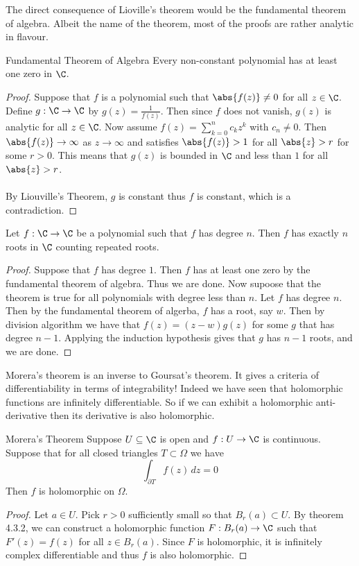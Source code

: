 \documentclass[a4paper]{article}
\begin{document}
The direct consequence of Lioville's theorem would be the fundamental theorem of algebra. Albeit the name of the theorem, most of the proofs are rather analytic in flavour. 

\begin{thm}{Fundamental Theorem of Algebra}{} Every non-constant polynomial has at least one zero in $\C$. \tcbline
\begin{proof}
Suppose that $f$ is a polynomial such that $\abs{f(z)}\neq 0$ for all $z\in\C$. Define $g:\C\to\C$ by $g(z)=\frac{1}{f(z)}$. Then since $f$ does not vanish, $g(z)$ is analytic for all $z\in\C$. Now assume $f(z)=\sum_{k=0}^nc_kz^k$ with $c_n\neq 0$. Then $\abs{f(z)}\to\infty$ as $z\to\infty$ and satisfies $\abs{f(z)}>1$ for all $\abs{z}>r$ for some $r>0$. This means that $g(z)$ is bounded in $\C$ and less than $1$ for all $\abs{z}>r$. \\~\\
By Liouville's Theorem, $g$ is constant thus $f$ is constant, which is a contradiction. 
\end{proof}
\end{thm}

\begin{prp}{}{} Let $f:\C\to\C$ be a polynomial such that $f$ has degree $n$. Then $f$ has exactly $n$ roots in $\C$ counting repeated roots. \tcbline
\begin{proof}
Suppose that $f$ has degree $1$. Then $f$ has at least one zero by the fundamental theorem of algebra. Thus we are done. Now supoose that the theorem is true for all polynomials with degree less than $n$. Let $f$ has degree $n$. Then by the fundamental theorem of algerba, $f$ has a root, say $w$. Then by division algorithm we have that $f(z)=(z-w)g(z)$ for some $g$ that has degree $n-1$. Applying the induction hypothesis gives that $g$ has $n-1$ roots, and we are done. 
\end{proof}
\end{prp}

Morera's theorem is an inverse to Goursat's theorem. It gives a criteria of differentiability in terms of integrability! Indeed we have seen that holomorphic functions are infinitely differentiable. So if we can exhibit a holomorphic anti-derivative then its derivative is also holomorphic. 

\begin{thm}{Morera's Theorem}{} Suppose $U\subseteq\C$ is open and $f:U\to\C$ is continuous. Suppose that for all closed triangles $T\subset\Omega$ we have $$\int_{\partial T}f(z)\,dz=0$$ Then $f$ is holomorphic on $\Omega$. \tcbline
\begin{proof}
Let $a\in U$. Pick $r>0$ sufficiently small so that $B_r(a)\subset U$. By theorem 4.3.2, we can construct a holomorphic function $F:B_r(a)\to\C$ such that $F'(z)=f(z)$ for all $z\in B_r(a)$. Since $F$ is holomorphic, it is infinitely complex differentiable and thus $f$ is also holomorphic. 
\end{proof}
\end{thm}
\end{document}
